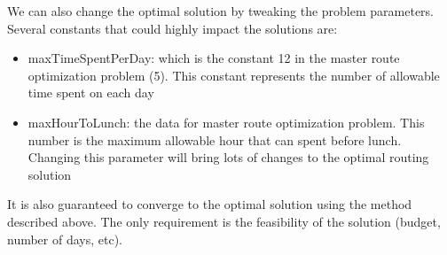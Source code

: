 \documentclass{article}
\begin{document}
	We can also change the optimal solution by tweaking the problem parameters. Several constants that could highly impact the solutions are:
	
	\begin{itemize}
		\item maxTimeSpentPerDay: which is the constant 12 in the master route optimization problem (5). This constant represents the number of allowable time spent on each day
		\item maxHourToLunch: the data for master route optimization problem. This number is the maximum allowable hour that can spent before lunch. Changing this parameter will bring lots of changes to the optimal routing solution
	\end{itemize}
	
	It is also guaranteed to converge to the optimal solution using the method described above. The only requirement is the feasibility of the solution (budget, number of days, etc).
\end{document}
